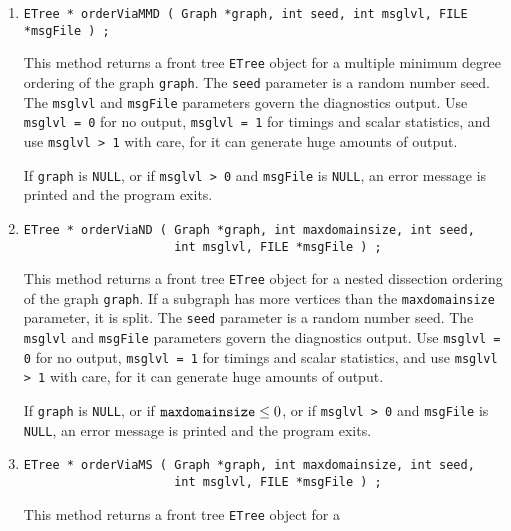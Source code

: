 \begin{enumerate}
\item
\begin{verbatim}
ETree * orderViaMMD ( Graph *graph, int seed, int msglvl, FILE *msgFile ) ;
\end{verbatim}
This method returns a front tree {\tt ETree} object for a multiple
minimum degree ordering of the graph {\tt graph}.
The {\tt seed} parameter is a random number seed.
The {\tt msglvl} and {\tt msgFile} parameters govern the
diagnostics output.
Use {\tt msglvl = 0} for no output, {\tt msglvl = 1} for timings
and scalar statistics, and use {\tt msglvl > 1} with care, for it
can generate huge amounts of output.
\par {}
If {\tt graph} is {\tt NULL},
or if {\tt msglvl > 0} and {\tt msgFile} is {\tt NULL}, 
an error message is printed and the program exits.
\item
\begin{verbatim}
ETree * orderViaND ( Graph *graph, int maxdomainsize, int seed, 
                     int msglvl, FILE *msgFile ) ;
\end{verbatim}
This method returns a front tree {\tt ETree} object for a nested
dissection ordering of the graph {\tt graph}.
If a subgraph has more vertices than the {\tt maxdomainsize} parameter,
it is split.
The {\tt seed} parameter is a random number seed.
The {\tt msglvl} and {\tt msgFile} parameters govern the
diagnostics output.
Use {\tt msglvl = 0} for no output, {\tt msglvl = 1} for timings
and scalar statistics, and use {\tt msglvl > 1} with care, for it
can generate huge amounts of output.
\par {}
If {\tt graph} is {\tt NULL},
or if ${\tt maxdomainsize} \le 0$,
or if {\tt msglvl > 0} and {\tt msgFile} is {\tt NULL}, 
an error message is printed and the program exits.
\item
\begin{verbatim}
ETree * orderViaMS ( Graph *graph, int maxdomainsize, int seed, 
                     int msglvl, FILE *msgFile ) ;
\end{verbatim}
This method returns a front tree {\tt ETree} object for a 

\end{enumerate}
